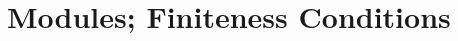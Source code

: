 \begin{solution}
    \td \\
\end{solution}

\begin{exercise}
    \td \\
\end{exercise}

\begin{solution}
    \td \\
\end{solution}

\begin{exercise}
    \td \\
\end{exercise}

\begin{solution}
    \td \\
\end{solution}

\begin{exercise}
    \td \\
\end{exercise}

\begin{solution}
    \td \\
\end{solution}

\begin{exercise}
    \td \\
\end{exercise}

\begin{solution}
    \td \\
\end{solution}

\begin{exercise}
    \td \\
\end{exercise}

\begin{solution}
    \td \\
\end{solution}

\section{Modules; Finiteness Conditions}

\begin{exercise}
    \td \\
\end{exercise}

